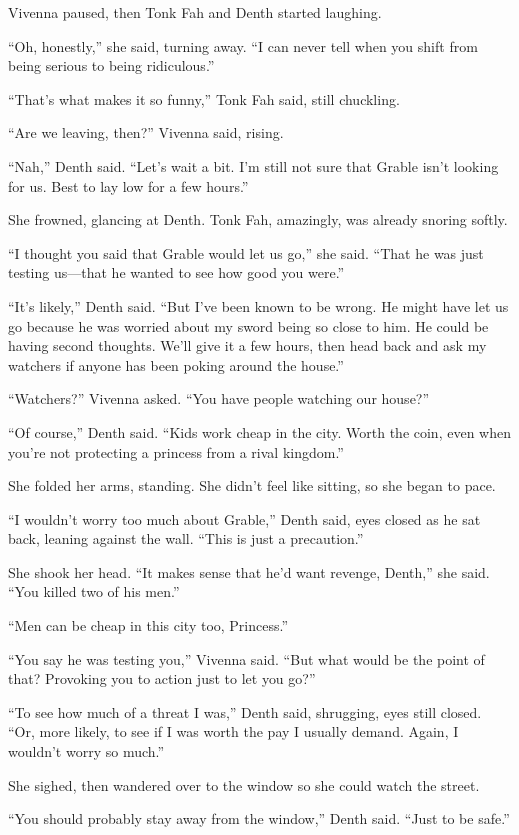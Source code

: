 Vivenna paused, then Tonk Fah and Denth started laughing.

“Oh, honestly,” she said, turning away. “I can never tell when you shift from being serious to being ridiculous.”

“That’s what makes it so funny,” Tonk Fah said, still chuckling.

“Are we leaving, then?” Vivenna said, rising.

“Nah,” Denth said. “Let’s wait a bit. I’m still not sure that Grable isn’t looking for us. Best to lay low for a few hours.”

She frowned, glancing at Denth. Tonk Fah, amazingly, was already snoring softly.

“I thought you said that Grable would let us go,” she said. “That he was just testing us—that he wanted to see how good you were.”

“It’s likely,” Denth said. “But I’ve been known to be wrong. He might have let us go because he was worried about my sword being so close to him. He could be having second thoughts. We’ll give it a few hours, then head back and ask my watchers if anyone has been poking around the house.”

“Watchers?” Vivenna asked. “You have people watching our house?”

“Of course,” Denth said. “Kids work cheap in the city. Worth the coin, even when you’re not protecting a princess from a rival kingdom.”

She folded her arms, standing. She didn’t feel like sitting, so she began to pace.

“I wouldn’t worry too much about Grable,” Denth said, eyes closed as he sat back, leaning against the wall. “This is just a precaution.”

She shook her head. “It makes sense that he’d want revenge, Denth,” she said. “You killed two of his men.”

“Men can be cheap in this city too, Princess.”

“You say he was testing you,” Vivenna said. “But what would be the point of that? Provoking you to action just to let you go?”

“To see how much of a threat I was,” Denth said, shrugging, eyes still closed. “Or, more likely, to see if I was worth the pay I usually demand. Again, I wouldn’t worry so much.”

She sighed, then wandered over to the window so she could watch the street.

“You should probably stay away from the window,” Denth said. “Just to be safe.”

